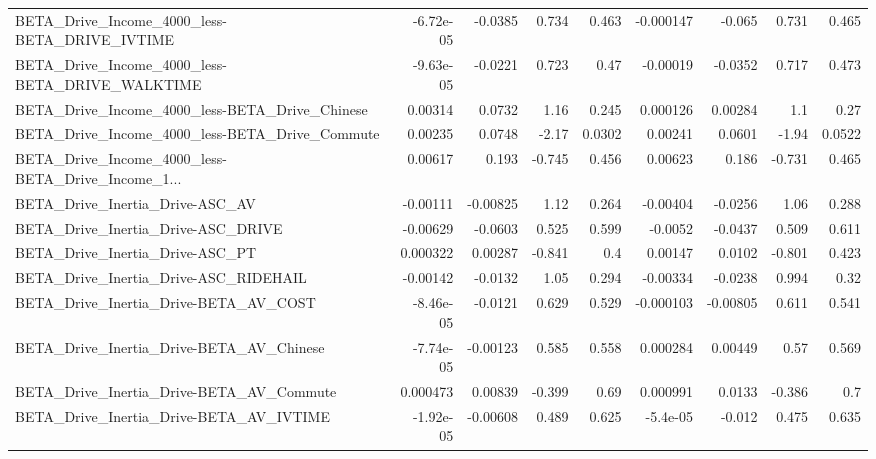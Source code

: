 \begin{tabular}{lrrrrrrrr}
BETA\_Drive\_Income\_4000\_less-BETA\_DRIVE\_IVTIME      &   -6.72e-05 &      -0.0385 &    0.734 &    0.463 &  -0.000147 &      -0.065 &        0.731 &         0.465 \\
BETA\_Drive\_Income\_4000\_less-BETA\_DRIVE\_WALKTIME    &   -9.63e-05 &      -0.0221 &    0.723 &     0.47 &   -0.00019 &     -0.0352 &        0.717 &         0.473 \\
BETA\_Drive\_Income\_4000\_less-BETA\_Drive\_Chinese     &     0.00314 &       0.0732 &     1.16 &    0.245 &   0.000126 &     0.00284 &          1.1 &          0.27 \\
BETA\_Drive\_Income\_4000\_less-BETA\_Drive\_Commute     &     0.00235 &       0.0748 &    -2.17 &   0.0302 &    0.00241 &      0.0601 &        -1.94 &        0.0522 \\
BETA\_Drive\_Income\_4000\_less-BETA\_Drive\_Income\_1... &     0.00617 &        0.193 &   -0.745 &    0.456 &    0.00623 &       0.186 &       -0.731 &         0.465 \\
BETA\_Drive\_Inertia\_Drive-ASC\_AV                    &    -0.00111 &     -0.00825 &     1.12 &    0.264 &   -0.00404 &     -0.0256 &         1.06 &         0.288 \\
BETA\_Drive\_Inertia\_Drive-ASC\_DRIVE                 &    -0.00629 &      -0.0603 &    0.525 &    0.599 &    -0.0052 &     -0.0437 &        0.509 &         0.611 \\
BETA\_Drive\_Inertia\_Drive-ASC\_PT                    &    0.000322 &      0.00287 &   -0.841 &      0.4 &    0.00147 &      0.0102 &       -0.801 &         0.423 \\
BETA\_Drive\_Inertia\_Drive-ASC\_RIDEHAIL              &    -0.00142 &      -0.0132 &     1.05 &    0.294 &   -0.00334 &     -0.0238 &        0.994 &          0.32 \\
BETA\_Drive\_Inertia\_Drive-BETA\_AV\_COST              &   -8.46e-05 &      -0.0121 &    0.629 &    0.529 &  -0.000103 &    -0.00805 &        0.611 &         0.541 \\
BETA\_Drive\_Inertia\_Drive-BETA\_AV\_Chinese           &   -7.74e-05 &     -0.00123 &    0.585 &    0.558 &   0.000284 &     0.00449 &         0.57 &         0.569 \\
BETA\_Drive\_Inertia\_Drive-BETA\_AV\_Commute           &    0.000473 &      0.00839 &   -0.399 &     0.69 &   0.000991 &      0.0133 &       -0.386 &           0.7 \\
BETA\_Drive\_Inertia\_Drive-BETA\_AV\_IVTIME            &   -1.92e-05 &     -0.00608 &    0.489 &    0.625 &   -5.4e-05 &      -0.012 &        0.475 &         0.635 \\

\end{tabular}
